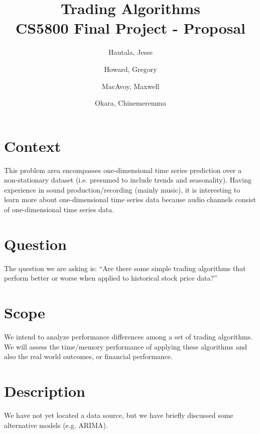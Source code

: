\documentclass[12pt,english]{article}
\title{\textbf{Trading Algorithms}\\
CS5800 Final Project - Proposal
}
\author{Hautala, Jesse \and Howard, Gregory \and MacAvoy, Maxwell \and Okara, Chinemeremma}
\begin{document}
\maketitle

\section*{Context}
This problem area encompasses one-dimensional time series prediction over a non-stationary dataset (i.e. presumed to include trends and seasonality). Having experience in sound production/recording (mainly music), it is interesting to learn more about one-dimensional time series data because audio channels consist of one-dimensional time series data.

\section*{Question}
The question we are asking is: ``Are there some simple trading algorithms that perform better or worse when applied to historical stock price data?''

\section*{Scope}
We intend to analyze performance differences among a set of trading algorithms. We will assess the time/memory performance of applying these algorithms and also the real world outcomes, or financial performance.

\section*{Description}
We have not yet located a data source, but we have briefly discussed some alternative models (e.g. ARIMA).

\end{document}
